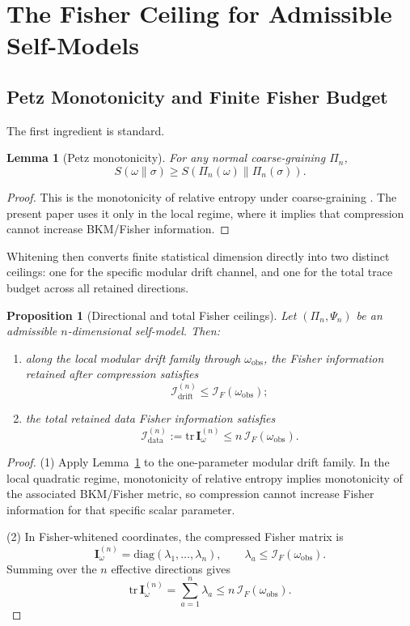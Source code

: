\documentclass[12pt]{article}
\newtheorem{proposition}[theorem]{Proposition}
\newtheorem{lemma}[theorem]{Lemma}
\theoremstyle{definition}
\theoremstyle{remark}
\begin{document}
\section{The Fisher Ceiling for Admissible Self-Models}\label{sec:3}

\subsection{Petz Monotonicity and Finite Fisher Budget}\label{subsec:3.1}

The first ingredient is standard.

\begin{lemma}[Petz monotonicity]\label{lem:3.1}
For any normal coarse-graining \(\Pi_n\),
\[
S(\omega\|\sigma)\ge S(\Pi_n(\omega)\|\Pi_n(\sigma)).
\]
\end{lemma}

\begin{proof}
This is the monotonicity of relative entropy under coarse-graining
\cite{Petz1986}. The present paper uses it only in the local regime,
where it implies that compression cannot increase BKM/Fisher
information.
\end{proof}

Whitening then converts finite statistical dimension directly into two
distinct ceilings: one for the specific modular drift channel, and one
for the total trace budget across all retained directions.

\begin{proposition}[Directional and total Fisher ceilings]\label{prop:3.2}
Let \((\Pi_n,\Psi_n)\) be an admissible \(n\)-dimensional self-model.
Then:
\begin{enumerate}
\item along the local modular drift family through
\(\omega_{\mathrm{obs}}\), the Fisher information retained after
compression satisfies
\[
\mathcal{I}^{(n)}_{\mathrm{drift}}
\le
\mathcal{I}_F(\omega_{\mathrm{obs}});
\]
\item the total retained data Fisher information satisfies
\[
\mathcal{I}^{(n)}_{\mathrm{data}}
:=
\mathrm{tr}\,\mathbf{I}^{(n)}_\omega
\le
n\,\mathcal{I}_F(\omega_{\mathrm{obs}}).
\]
\end{enumerate}
\end{proposition}

\begin{proof}
\(\!\)(1) Apply Lemma~\ref{lem:3.1} to the one-parameter modular drift
family. In the local quadratic regime, monotonicity of relative entropy
implies monotonicity of the associated BKM/Fisher metric, so
compression cannot increase Fisher information for that specific scalar
parameter.

\(\!\)(2) In Fisher-whitened coordinates, the compressed Fisher matrix is
\[
\mathbf{I}^{(n)}_\omega
=
\mathrm{diag}(\lambda_1,\dots,\lambda_n),
\qquad
\lambda_a \le \mathcal{I}_F(\omega_{\mathrm{obs}}).
\]
Summing over the \(n\) effective directions gives
\[
\mathrm{tr}\,\mathbf{I}^{(n)}_\omega
=
\sum_{a=1}^n \lambda_a
\le
n\,\mathcal{I}_F(\omega_{\mathrm{obs}}).
\]
\end{proof}
\end{document}
